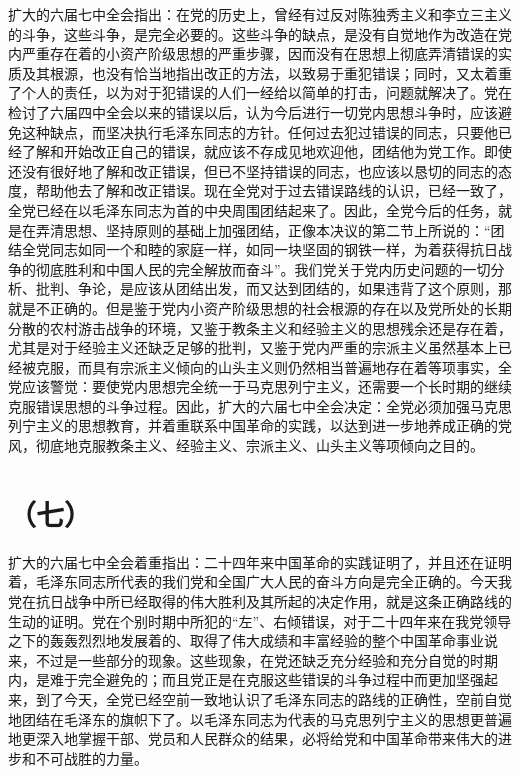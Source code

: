 扩大的六届七中全会指出：在党的历史上，曾经有过反对陈独秀主义和李立三主义的斗争，这些斗争，是完全必要的。这些斗争的缺点，是没有自觉地作为改造在党内严重存在着的小资产阶级思想的严重步骤，因而没有在思想上彻底弄清错误的实质及其根源，也没有恰当地指出改正的方法，以致易于重犯错误；同时，又太着重了个人的责任，以为对于犯错误的人们一经给以简单的打击，问题就解决了。党在检讨了六届四中全会以来的错误以后，认为今后进行一切党内思想斗争时，应该避免这种缺点，而坚决执行毛泽东同志的方针。任何过去犯过错误的同志，只要他已经了解和开始改正自己的错误，就应该不存成见地欢迎他，团结他为党工作。即使还没有很好地了解和改正错误，但已不坚持错误的同志，也应该以恳切的同志的态度，帮助他去了解和改正错误。现在全党对于过去错误路线的认识，已经一致了，全党已经在以毛泽东同志为首的中央周围团结起来了。因此，全党今后的任务，就是在弄清思想、坚持原则的基础上加强团结，正像本决议的第二节上所说的：“团结全党同志如同一个和睦的家庭一样，如同一块坚固的钢铁一样，为着获得抗日战争的彻底胜利和中国人民的完全解放而奋斗”。我们党关于党内历史问题的一切分析、批判、争论，是应该从团结出发，而又达到团结的，如果违背了这个原则，那就是不正确的。但是鉴于党内小资产阶级思想的社会根源的存在以及党所处的长期分散的农村游击战争的环境，又鉴于教条主义和经验主义的思想残余还是存在着，尤其是对于经验主义还缺乏足够的批判，又鉴于党内严重的宗派主义虽然基本上已经被克服，而具有宗派主义倾向的山头主义则仍然相当普遍地存在着等项事实，全党应该警觉：要使党内思想完全统一于马克思列宁主义，还需要一个长时期的继续克服错误思想的斗争过程。因此，扩大的六届七中全会决定：全党必须加强马克思列宁主义的思想教育，并着重联系中国革命的实践，以达到进一步地养成正确的党风，彻底地克服教条主义、经验主义、宗派主义、山头主义等项倾向之目的。

\section*{（七）}

扩大的六届七中全会着重指出：二十四年来中国革命的实践证明了，并且还在证明着，毛泽东同志所代表的我们党和全国广大人民的奋斗方向是完全正确的。今天我党在抗日战争中所已经取得的伟大胜利及其所起的决定作用，就是这条正确路线的生动的证明。党在个别时期中所犯的“左”、右倾错误，对于二十四年来在我党领导之下的轰轰烈烈地发展着的、取得了伟大成绩和丰富经验的整个中国革命事业说来，不过是一些部分的现象。这些现象，在党还缺乏充分经验和充分自觉的时期内，是难于完全避免的；而且党正是在克服这些错误的斗争过程中而更加坚强起来，到了今天，全党已经空前一致地认识了毛泽东同志的路线的正确性，空前自觉地团结在毛泽东的旗帜下了。以毛泽东同志为代表的马克思列宁主义的思想更普遍地更深入地掌握干部、党员和人民群众的结果，必将给党和中国革命带来伟大的进步和不可战胜的力量。

